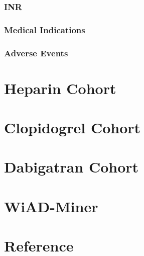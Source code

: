 \documentclass{article}
\begin{document}
\subsubsection{INR}


\subsubsection{Medical Indications}


\subsubsection{Adverse Events}


\section{Heparin Cohort}

\section{Clopidogrel Cohort}


\section{Dabigatran Cohort}

\section{WiAD-Miner}


\section{Reference}
\end{document}
